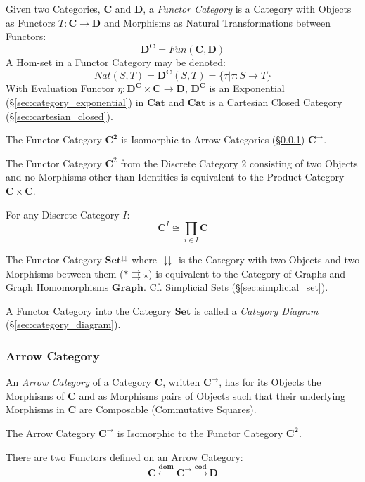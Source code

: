 Given two Categories, $\mathbf{C}$ and $\mathbf{D}$, a \emph{Functor
  Category} is a Category with Objects as Functors $T : \mathbf{C}
\rightarrow \mathbf{D}$ and Morphisms as Natural Transformations
between Functors:
\[
  \mathbf{D}^{\mathbf{C}} = Fun(\mathbf{C},\mathbf{D})
\]
A Hom-set in a Functor Category may be denoted:
\[
  Nat(S,T) = \mathbf{D}^{\mathbf{C}}(S,T) =
    \{ \tau | \tau : S \rightarrow T \}
\]
With Evaluation Functor $\eta : \mathbf{D^C} \times \mathbf{C}
\rightarrow \mathbf{D}$, $\mathbf{D^C}$ is an Exponential
(\S\ref{sec:category_exponential}) in $\mathbf{Cat}$ and
$\mathbf{Cat}$ is a Cartesian Closed Category
(\S\ref{sec:cartesian_closed}).

The Functor Category $\mathbf{C^2}$ is Isomorphic to Arrow Categories
(\S\ref{sec:arrow_category}) $\mathbf{C}^\rightarrow$.

The Functor Category $\mathbf{C}^\mathrm{2}$ from the Discrete
Category $\mathrm{2}$ consisting of two Objects and no Morphisms other
than Identities is equivalent to the Product Category $\mathbf{C}
\times \mathbf{C}$.

For any Discrete Category $I$:
\[
  \mathbf{C}^I \cong \prod_{i \in I} \mathbf{C}
\]

The Functor Category $\mathbf{Set}^\downdownarrows$ where
$\downdownarrows$ is the Category with two Objects and two Morphisms
between them ($* \rightrightarrows \star$) is equivalent to the
Category of Graphs and Graph Homomorphisms $\mathbf{Graph}$. Cf.
Simplicial Sets (\S\ref{sec:simplicial_set}).

A Functor Category into the Category $\mathbf{Set}$ is called a
\emph{Category Diagram} (\S\ref{sec:category_diagram}).



\subsubsection{Arrow Category}\label{sec:arrow_category}

An \emph{Arrow Category} of a Category $\mathbf{C}$, written
$\mathbf{C^{\rightarrow}}$, has for its Objects the Morphisms of
$\mathbf{C}$ and as Morphisms pairs of Objects such that their
underlying Morphisms in $\mathbf{C}$ are Composable (Commutative
Squares).

The Arrow Category $\mathbf{C}^\rightarrow$ is Isomorphic to the
Functor Category $\mathbf{C^2}$.

There are two Functors defined on an Arrow Category:
\[
  \mathbf{C} \xleftarrow{\mathbf{dom}} \mathbf{C}^\rightarrow
  \xrightarrow{\mathbf{cod}} \mathbf{D}
\]



